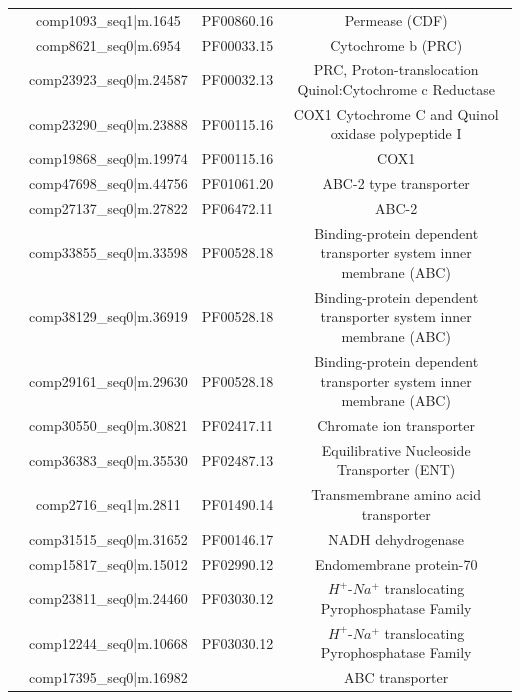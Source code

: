 \begin{table}
\begin{tabular}{|c|c|c|c|}
                            & comp1093\_seq1|m.1645   & PF00860.16 & Permease (CDF) \\
                            & comp8621\_seq0|m.6954   & PF00033.15 & Cytochrome b (PRC) \\
                            & comp23923\_seq0|m.24587 & PF00032.13 & PRC, Proton-translocation Quinol:Cytochrome c Reductase\\
                            & comp23290\_seq0|m.23888 & PF00115.16 & COX1 Cytochrome C and Quinol oxidase polypeptide I \\
                            & comp19868\_seq0|m.19974 & PF00115.16 & COX1 \\
                            & comp47698\_seq0|m.44756 & PF01061.20 & ABC-2 type transporter \\
                            & comp27137\_seq0|m.27822 & PF06472.11 & ABC-2 \\
                            & comp33855\_seq0|m.33598 & PF00528.18 & Binding-protein dependent transporter system inner membrane (ABC)\\
                            & comp38129\_seq0|m.36919 & PF00528.18 & Binding-protein dependent transporter system inner membrane (ABC)\\ 
                            & comp29161\_seq0|m.29630 & PF00528.18 & Binding-protein dependent transporter system inner membrane (ABC)\\
                            & comp30550\_seq0|m.30821 & PF02417.11 & Chromate ion transporter \\
                            & comp36383\_seq0|m.35530 & PF02487.13 & Equilibrative Nucleoside Transporter (ENT)\\
                            & comp2716\_seq1|m.2811   & PF01490.14 & Transmembrane amino acid transporter \\
                            & comp31515\_seq0|m.31652 & PF00146.17 & NADH dehydrogenase \\
                            & comp15817\_seq0|m.15012 & PF02990.12 & Endomembrane protein-70 \\
                            & comp23811\_seq0|m.24460 & PF03030.12 & \(H^{+}\)-\(Na^{+}\) translocating Pyrophosphatase Family \\
                            & comp12244\_seq0|m.10668 & PF03030.12 & \(H^{+}\)-\(Na^{+}\) translocating Pyrophosphatase Family \\
                            & comp17395\_seq0|m.16982 &  & ABC transporter \\ 

\end{tabular}
\end{table}
